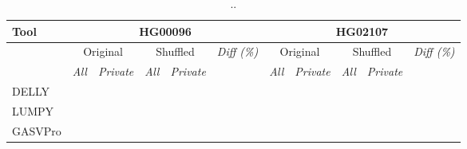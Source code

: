 \begin{table}[htb]
\begin{center}
\begin{tabular}{|l|c|c||c|c||c||c|c||c|c||c|}
\hline
{\bf Tool} & \multicolumn{5}{|c||}{\bf HG00096} & \multicolumn{5}{|c|}{\bf HG02107} \\
\hline
{\bf } & \multicolumn{2}{c||}{Original} & \multicolumn{2}{c||}{Shuffled} & {\it Diff (\%) }
& \multicolumn{2}{c||}{Original} & \multicolumn{2}{c||}{Shuffled} & {\it Diff (\%) } \\
\cline{2-11}
{\bf } & {\it All } & {\it Private } & {\it All } & {\it Private } & {\it }
& {\it All } & {\it Private } &  {\it All } & {\it Private } & {\it }\\
\hline
DELLY & & & & & & & & & & \\
LUMPY  & & & & & & & & & & \\
GASVPro & & & & & & & & & & \\
\hline
\end{tabular}
\end{center}
\caption{ .. }
\label{tab:dels-orig-vs-shuf}
\end{table}


